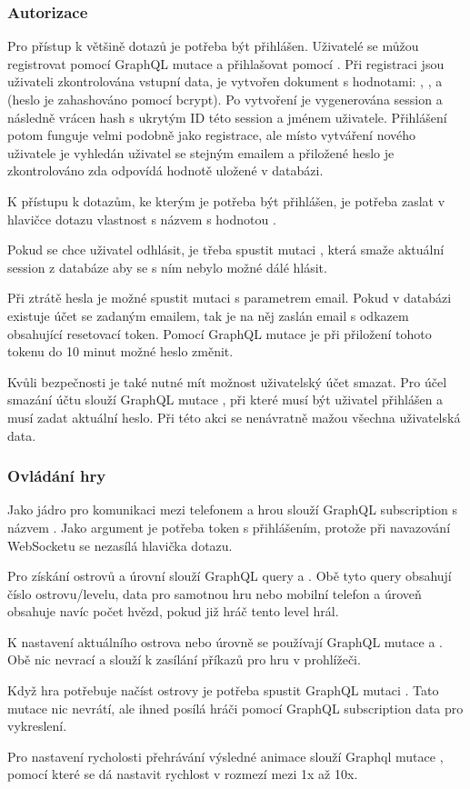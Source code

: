 \subsubsection{Autorizace}
Pro přístup k většině dotazů je potřeba být přihlášen. Uživatelé se můžou registrovat pomocí GraphQL mutace  a přihlašovat pomocí . Při registraci jsou uživateli zkontrolována vstupní data, je vytvořen dokument s hodnotami: , ,  a  (heslo je zahashováno pomocí bcrypt\cite{bcrypt}). Po vytvoření je vygenerována session a následně vrácen hash s ukrytým ID této session a jménem uživatele. Přihlášení potom funguje velmi podobně jako registrace, ale místo vytváření nového uživatele je vyhledán uživatel se stejným emailem a přiložené heslo je zkontrolováno zda odpovídá hodnotě uložené v databázi.\par
K přístupu k dotazům, ke kterým je potřeba být přihlášen, je potřeba zaslat v hlavičce dotazu vlastnost s názvem  s hodnotou .\par
Pokud se chce uživatel odhlásit, je třeba spustit mutaci , která smaže aktuální session z databáze aby se s ním nebylo možné dálé hlásit.\par
Při ztrátě hesla je možné spustit mutaci  s parametrem email. Pokud v databázi existuje účet se zadaným emailem, tak je na něj zaslán email s odkazem obsahující resetovací token. Pomocí GraphQL mutace  je při přiložení tohoto tokenu do 10 minut možné heslo změnit.\par
Kvůli bezpečnosti je také nutné mít možnost uživatelský účet smazat. Pro účel smazání účtu slouží GraphQL mutace , při které musí být uživatel přihlášen a musí zadat aktuální heslo. Při této akci se nenávratně mažou všechna uživatelská data.

\subsubsection{Ovládání hry}
Jako jádro pro komunikaci mezi telefonem a hrou slouží GraphQL subscription s názvem . Jako argument je potřeba token s přihlášením, protože při navazování WebSocketu se nezasílá hlavička dotazu.\par
Pro získání ostrovů a úrovní slouží GraphQL query  a . Obě tyto query obsahují číslo ostrovu/levelu, data pro samotnou hru nebo mobilní telefon a úroveň obsahuje navíc počet hvězd, pokud již hráč tento level hrál.\par
K nastavení aktuálního ostrova nebo úrovně se používají GraphQL mutace  a . Obě nic nevrací a slouží k zasílání příkazů pro hru v prohlížeči.\par
Když hra potřebuje načíst ostrovy je potřeba spustit GraphQL mutaci . Tato mutace nic nevrátí, ale ihned posílá hráči pomocí GraphQL subscription data pro vykreslení.\par
Pro nastavení rycholosti přehrávání výsledné animace slouží Graphql mutace , pomocí které se dá nastavit rychlost v rozmezí mezi 1x až 10x.


